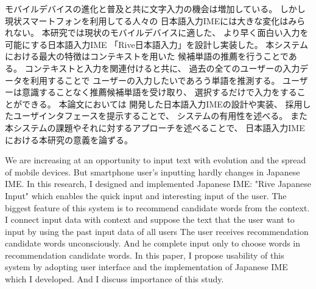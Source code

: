 


\begin{jabstract}

モバイルデバイスの進化と普及と共に文字入力の機会は増加している。
しかし現状スマートフォンを利用してる人々の
日本語入力IMEには大きな変化はみられない。
本研究では現状のモバイルデバイスに適した、
より早く面白い入力を可能にする日本語入力IME
「Rive日本語入力」を設計し実装した。
本システムにおける最大の特徴はコンテキストを用いた
候補単語の推薦を行うことである。
コンテキストと入力を関連付けると共に、
過去の全てのユーザーの入力データを利用することで
ユーザーの入力したいであろう単語を推測する。
ユーザーは意識することなく推薦候補単語を受け取り、
選択するだけで入力をすることができる。
本論文においては
開発した日本語入力IMEの設計や実装、
採用したユーザインタフェースを提示することで、
システムの有用性を述べる。
また本システムの課題やそれに対するアプローチを述べることで、
日本語入力IMEにおける本研究の意義を論ずる。

\end{jabstract}

\begin{eabstract}

We are increasing at an opportunity to input text
with evolution and the spread of mobile devices.
But smartphone user's inputting hardly changes in Japanese IME.
In this research, I designed and implemented Japanese IME:
"Rive Japanese Input" which enables the quick input
and interesting input of the user.
The biggest feature of this system is to recommend candidate words
from the context.
I connect input data with context and suppose the text
that the user want to input by using the past input data
of all users
The user receives recommendation candidate words unconsciously.
And he complete input only to choose words in recommendation
candidate words.
In this paper, I propose usability of this system by adopting
user interface and the implementation of Japanese IME which
I developed.
And I discuss importance of this study.

\end{eabstract}
